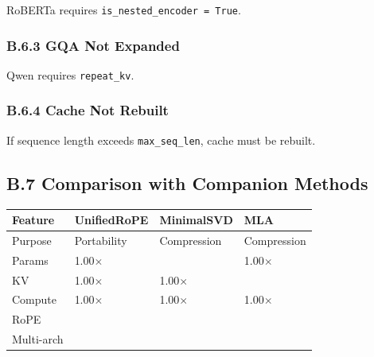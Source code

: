 RoBERTa requires \texttt{is\_nested\_encoder = True}.

\subsubsection{B.6.3 GQA Not Expanded}

Qwen requires \texttt{repeat\_kv}.

\subsubsection{B.6.4 Cache Not Rebuilt}

If sequence length exceeds \texttt{max\_seq\_len}, cache must be rebuilt.

\subsection{B.7 Comparison with Companion Methods}

\begin{table}[H]
\centering
\small
\begin{tabular}{llll}
\toprule
\textbf{Feature} & \textbf{UnifiedRoPE} & \textbf{MinimalSVD} & \textbf{MLA} \\
\midrule
Purpose & Portability & Compression & Compression \\
Params & 1.00$\times$ &  & 1.00$\times$ \\
KV & 1.00$\times$ & 1.00$\times$ &  \\
Compute & 1.00$\times$ & 1.00$\times$ & 1.00$\times$ \\
RoPE &  &  &  \\
Multi-arch &  &  &  \\
\bottomrule
\end{tabular}
\end{table}

